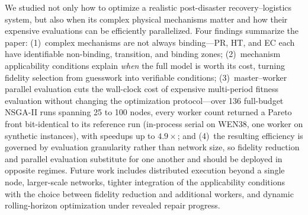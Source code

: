 \documentclass[10pt,conference,letterpaper]{IEEEtran}
\begin{document}
We studied not only how to optimize a realistic post-disaster
recovery--logistics system, but also when its complex physical mechanisms
matter and how their expensive evaluations can be efficiently
parallelized. Four findings summarize the paper: (1)~complex mechanisms
are not always binding---PR, HT, and EC each have identifiable
non-binding, transition, and binding zones; (2)~mechanism applicability
conditions explain \emph{when} the full model is worth its cost, turning
fidelity selection from guesswork into verifiable conditions;
(3)~master--worker parallel evaluation cuts the wall-clock cost of
expensive multi-period fitness evaluation without changing the
optimization protocol---over 136 full-budget NSGA-II runs spanning 25 to
100 nodes, every worker count returned a Pareto front bit-identical to
its reference run (in-process serial on WEN38, one worker on synthetic instances), with speedups up to $4.9\times$; and (4)~the resulting
efficiency is governed by evaluation granularity rather than network
size, so fidelity reduction and parallel evaluation substitute for one
another and should be deployed in opposite regimes.
Future work includes distributed execution beyond a single node,
larger-scale networks, tighter integration of the applicability
conditions with the choice between fidelity reduction and additional
workers, and dynamic rolling-horizon optimization under revealed repair
progress.
\end{document}
